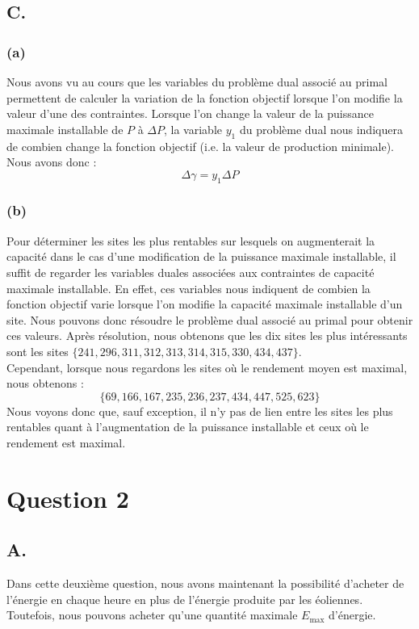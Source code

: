 \documentclass{article}
\begin{document}
\subsection*{C.}
\subsubsection*{(a)}
Nous avons vu au cours que les variables du problème dual associé au primal permettent de calculer la variation de la fonction objectif
lorsque l'on modifie la valeur d'une des contraintes. Lorsque l'on change la valeur de la puissance maximale installable de $P$ à $\Delta P$, la variable $y_1$ du problème dual nous indiquera de combien change
la fonction objectif (i.e. la valeur de production minimale). Nous avons donc :
\begin{equation*}
    \Delta \gamma = y_1 \Delta P
\end{equation*}

\subsubsection*{(b)}
Pour déterminer les sites les plus rentables sur lesquels on augmenterait la capacité dans le cas d'une modification de la puissance maximale installable, il suffit de regarder les variables duales associées aux contraintes de capacité maximale installable. En effet, ces variables nous indiquent de combien la fonction objectif varie lorsque l'on modifie la capacité maximale installable d'un site.
Nous pouvons donc résoudre le problème dual associé au primal pour obtenir ces valeurs. Après résolution, nous obtenons que les dix sites les plus intéressants sont les sites $\{241, 296, 311, 312, 313, 314, 315, 330, 434, 437\}$.\\
Cependant, lorsque nous regardons les sites où le rendement moyen est maximal, nous obtenons : $$\{ 69, 166, 167, 235, 236, 237, 434, 447, 525, 623 \}$$
Nous voyons donc que, sauf exception, il n'y pas de lien entre les sites les plus rentables quant à l'augmentation de la puissance installable et ceux où le rendement est maximal.
\newpage

\section*{Question 2}

\subsection*{A.}
Dans cette deuxième question, nous avons maintenant la possibilité
d'acheter de l'énergie en chaque heure en plus de l'énergie produite par les éoliennes.
Toutefois, nous pouvons acheter qu'une quantité maximale $E_{\text{max}}$ d'énergie.\\
\end{document}
